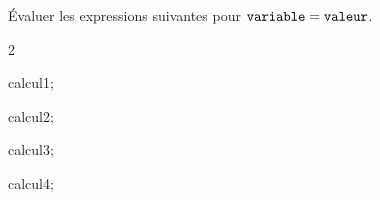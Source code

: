 \documentclass[exercice]{thedocument}%
\begin{document}
%
\smallskip\par\noindent Évaluer les expressions suivantes pour $\<variable;=\<valeur;$.
\begin{enumerate}
    \begin{multicols}{2}
        \item \<calcul1;
        \item \<calcul2;
        \columnbreak
        \item \<calcul3;
        \item \<calcul4;
    \end{multicols}
\end{enumerate}
\end{document}
